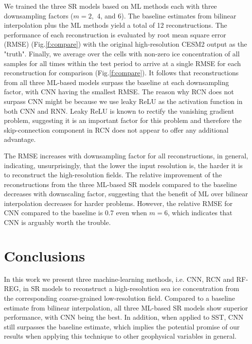 \documentclass[]{copernicus}
\begin{document}
We trained the three SR models based on ML methods each with three downsampling factors ($m=2,$ 4, and 6). The baseline estimates from bilinear interpolation plus the ML methods yield a total of 12 reconstructions. The performance of each reconstruction is evaluated by root mean square error (RMSE) (Fig.\ref{f:compare}) with the original high-resolution CESM2 output as the "truth". Finally, we average over the cells with non-zero ice concentration of all samples for all times within the test period to arrive at a single RMSE for each reconstruction for comparison (Fig.\ref{f:compare}). It follows that reconstructions from all three ML-based models surpass the baseline at each downsampling factor, with CNN having the smallest RMSE. The reason why RCN does not surpass CNN might be because we use leaky ReLU as the activation function in both CNN and RNN. Leaky ReLU is known to rectify the vanishing gradient problem, suggesting it is an important factor for this problem and therefore the skip-connection component in RCN does not appear to offer any additional advantage. 

The RMSE increases with downsampling factor for all reconstructions, in general, indicating, unsurprisingly, that the lower the input resolution is, the harder it is to reconstruct the high-resolution fields. The relative improvement of the reconstructions from the three ML-based SR models compared to the baseline decreases with downscaling factor, suggesting that the benefit of ML over bilinear interpolation decreases for harder problems. However, the relative RMSE for CNN compared to the baseline is 0.7 even when $m=6$, which indicates that CNN is arguably worth the trouble.


\section{Conclusions}
In this work we present three machine-learning methods, i.e. CNN, RCN and RF-REG, in SR models to reconstruct a high-resolution sea ice concentration from the corresponding coarse-grained low-resolution field. Compared to a baseline estimate from bilinear interpolation, all three ML-based SR models show superior performance, with CNN being the best. In addition, when applied to SST, CNN still surpasses the baseline estimate, which implies the potential promise of our results when applying this technique to other geophysical variables in general. 
\end{document}
